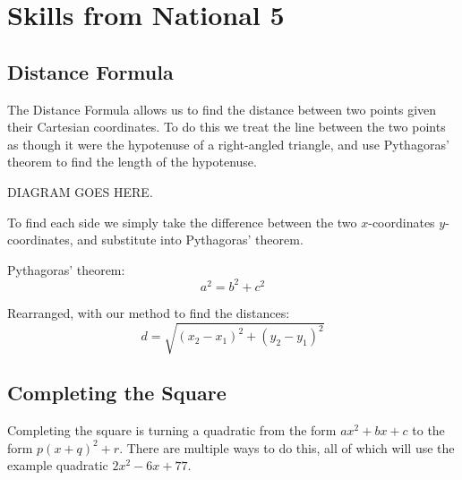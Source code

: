 \chapter{Skills from National 5}

\section{Distance Formula}
The Distance Formula allows us to find the distance between two points given their Cartesian coordinates. To do this we treat the line between the two points as though it were the hypotenuse of a right-angled triangle, and use Pythagoras' theorem to find the length of the hypotenuse.

DIAGRAM GOES HERE.

To find each side we simply take the difference between the two $x$-coordinates $y$-coordinates, and substitute into Pythagoras' theorem.

Pythagoras' theorem:
\begin{equation*}
	a^2 = b^2+c^2
\end{equation*}

Rearranged, with our method to find the distances:
\begin{equation*}
	d = \sqrt{(x_2-x_1)^2+(y_2-y_1)^2}
\end{equation*}

\section{Completing the Square}
Completing the square is turning a quadratic from the form $ax^2 + bx + c$ to the form $p(x + q)^2+r$. There are multiple ways to do this, all of which will use the example quadratic $2x^2-6x+77$.

